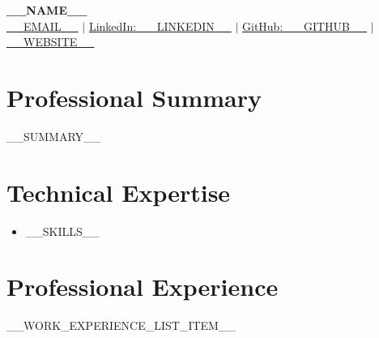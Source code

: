 \documentclass[letterpaper,11pt]{article}
\makeatletter
\newcommand{\resumeItem}[1]{
  \item\small{
    {#1 \vspace{-2pt}}
  }
}
\newcommand{\resumeProjectHeading}[2]{
    \vspace{3pt}\item
    \begin{tabular*}{0.97\textwidth}{l@{\extracolsep{\fill}}r}
      \small#1 & #2 \\
    \end{tabular*}\vspace{-9pt}
}
\newcommand{\resumeSubHeadingListStart}{\begin{itemize}[leftmargin=0.15in, label={}]}
\newcommand{\resumeSubHeadingListEnd}{\end{itemize}}
\newcommand{\resumeSectionBody}[1]{
  \vspace{0.7em}
  \small #1
  \vspace{-5pt}
}
\makeatother
\begin{document}

\hypersetup{urlcolor = black} %

\begin{center}
    \textbf{\LARGE __NAME__} \\ \vspace{3pt}
    \small
     \hspace{.5pt} {\underline{__EMAIL__}}
    $|$
     \hspace{.5pt} {\underline{LinkedIn: __LINKEDIN__}}
    $|$
     \hspace{.5pt} {\underline{GitHub: __GITHUB__}}
    $|$
 \hspace{.5pt} {\underline{__WEBSITE__}}
\end{center}
\vspace{-18pt}

\hypersetup{urlcolor = linkcolor} %

\section{Professional Summary}
__SUMMARY__


\section{Technical Expertise}
\resumeSubHeadingListStart
  \resumeItem{
    \small{
      __SKILLS__\\[-5pt]
    }
  }
\resumeSubHeadingListEnd
\vspace{-5pt}

\section{Professional Experience}
  __WORK_EXPERIENCE_LIST_ITEM__
  \vspace{-15pt}

      
\end{document}
